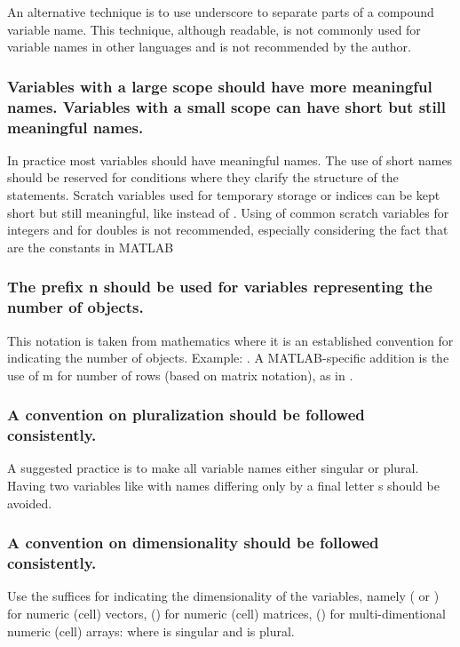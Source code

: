 \documentclass[titlepage,a4paper,12pt]{article}
\begin{document}
 An alternative technique is to use underscore to
separate parts of a compound variable name. This technique, although
readable, is not commonly used for variable names in other languages
and is not recommended by the author.

\subsubsection{Variables with a
large scope should have more meaningful names. Variables with a
small scope can have short but still meaningful names.}
 In practice most variables should have
meaningful names. The use of short names should be reserved for
conditions where they clarify the structure of the statements.
Scratch variables used for temporary storage or indices can be kept
short but still meaningful, like  instead of
. Using of common scratch
variables  for integers and  for
doubles is not recommended, especially considering the fact that
 are the constants in MATLAB

\subsubsection{The prefix n should be used for variables representing
the number of objects.}
 This notation is taken from mathematics where it is an
established convention for indicating the number of objects.
Example: . A
MATLAB-specific addition is the use of m for number of rows (based
on matrix notation), as in .

\subsubsection{A convention on pluralization should be followed
consistently.}
A suggested practice is to make all variable names either singular or plural. Having two variables like  with names differing only by a final letter s should be avoided.
\subsubsection{A convention on dimensionality should be followed
consistently.}
Use the suffices for indicating the dimensionality of the variables, namely
 ( or ) for numeric (cell) vectors,
() for numeric (cell) matrices, () for multi-dimentional numeric (cell) arrays:  where  is singular and
 is plural.
\end{document}
